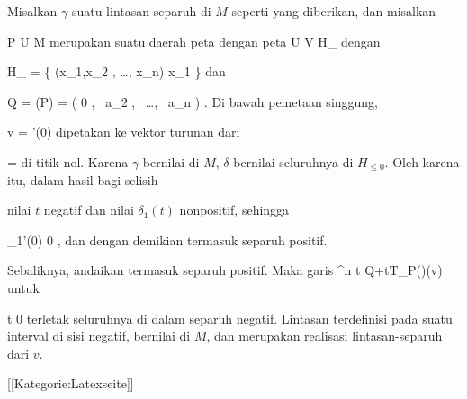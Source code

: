 Misalkan $\gamma$ suatu lintasan-separuh di $M$ seperti yang diberikan, dan misalkan

\mavergleichskette
{\vergleichskette
{ P
}
{ \in }{  U
}
{ \subseteq }{ M
}
{    }{
}
{   }{
}
}
{}{}{}
merupakan suatu daerah peta dengan peta
\maabbdisp {\alpha} { U } {V \subseteq  H_{}
} {}
dengan

\mavergleichskettedisp
{\vergleichskette
{  H_{}
}
{ =} { \left\{ (x_1,x_2 , \ldots, x_n)  \mid   x_1         \right\}
}
{ } {
}
{ } {
}
{ } {
}
}
{}{}{}
dan

\mavergleichskettedisp
{\vergleichskette
{ Q
}
{ =} { \alpha(P)
}
{ =} { \left(  0   , \,  a_2  , \,   \ldots , \,  a_n                \right)
}
{ } {
}
{ } {
}
}
{}{}{.}
Di bawah pemetaan singgung,

\mavergleichskette
{\vergleichskette
{ v
}
{ = }{ \gamma'(0)
}
{  }{
}
{    }{
}
{   }{
}
}
{}{}{}
dipetakan ke vektor turunan dari

\mavergleichskette
{\vergleichskette
{ \delta
}
{ = }{ \alpha \circ \gamma
}
{  }{
}
{    }{
}
{   }{
}
}
{}{}{}
di titik nol. Karena $\gamma$ bernilai di $M$, $\delta$ bernilai seluruhnya di $H_{\leq 0}$. Oleh karena itu, dalam hasil bagi selisih

 {  }

nilai $t$ negatif dan nilai $\delta_1(t)$ nonpositif, sehingga

\mavergleichskettedisp
{\vergleichskette
{  \delta_1'(0)
}
{ \geq} { 0
}
{ } {
}
{ } {
}
{ } {
}
}
{}{}{,}
dan dengan demikian termasuk separuh positif.

Sebaliknya, andaikan
 termasuk separuh positif. Maka garis
\maabbeledisp {\delta} {\R} {\R^n
} { t } { Q+tT_P(\alpha)(v)
} {}
untuk

\mavergleichskette
{\vergleichskette
{ t
}
{ \leq }{  0
}
{  }{
}
{    }{
}
{   }{
}
}
{}{}{}
terletak seluruhnya di dalam separuh negatif. Lintasan
 terdefinisi pada suatu interval di sisi negatif, bernilai di $M$, dan merupakan realisasi lintasan-separuh dari $v$.

 [[Kategorie:Latexseite]]
